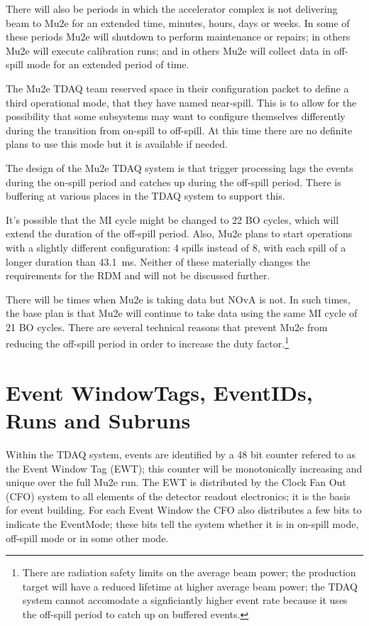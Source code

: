 There will also be periods in which the accelerator complex is not delivering
beam to Mu2e for an extended time, minutes, hours, days or weeks.
In some of these periods Mu2e will shutdown to perform maintenance or repairs;
in others Mu2e will execute calibration runs;
and in others Mu2e will collect data in off-spill mode for an extended period of time.

The Mu2e TDAQ team reserved space in their configuration packet to define
a third operational mode, that they have named near-spill.
This is to allow for the possibility that some subsystems may want to
configure themselves differently during the transition from on-spill to off-spill.
At this time there are no definite plans to use this mode but it is available if needed.

The design of the Mu2e TDAQ system is that trigger processing lags the events
during the on-spill period and catches up during the off-spill period.  There is
buffering at various places in the TDAQ system to support this.

It's possible that the MI cycle might be changed to 22 BO cycles, which
will extend the duration of the off-spill period.
Also, Mu2e plans to start operations with a slightly different configuration:
4 spills instead of 8, with each spill of a longer duration than 43.1~ms.
Neither of these materially changes the requirements for the RDM and
will not be discussed further.

There will be times when Mu2e is taking data but NOvA is not.
In such times, the base plan is that Mu2e will continue to take data using the same MI cycle of 21 BO cycles.
There are several technical reasons that prevent Mu2e from reducing the off-spill period
in order to increase the duty factor.\footnote{
There are radiation safety limits on the average beam power;
the production target will have a reduced lifetime at higher average beam power;
the TDAQ system cannot accomodate a signficiantly higher event rate because it
uses the off-spill period to catch up on buffered events.
}

\section{Event WindowTags, EventIDs, Runs and Subruns}
\label{sec:TagsIDsRunsSubRuns}

Within the TDAQ system, events are identified by a 48 bit counter refered
to as the Event Window Tag (EWT);
this counter will be monotonically increasing and unique over the full Mu2e run.
The EWT is distributed by the Clock Fan Out (CFO) system to all elements of the
detector readout electronics;
it is the basis for event building.
For each Event Window the CFO also distributes a few bits to indicate the
EventMode; these bits tell the system whether it is in on-spill mode, off-spill mode
or in some other mode.

